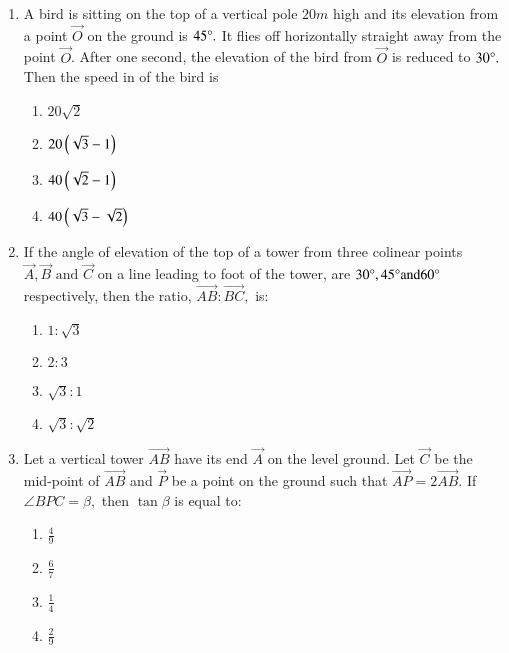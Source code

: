 \documentclass[journal]{IEEEtran}
\theoremstyle{remark}
\begin{document}
\begin{enumerate}[start=3]
\item A bird is sitting on the top of a vertical pole $20m$ high and its elevation from a point $\vec{O}$ on the  ground is $45\degree.$ It flies off horizontally straight away from the point $\vec{O}$. After one second, the elevation of the bird from $\vec{O}$ is reduced to $30\degree.$ Then the speed in  of the bird is \hfill{}
\begin{multicols}{4}
\begin{enumerate}
        \item $20\sqrt{2}$                    
        \item $20\left(\sqrt{3}-1\right)$ 
        \item $40\left(\sqrt{2}-1\right)$ 
        \item $40\left(\sqrt{3}-\sqrt{2}\right)$
\end{enumerate}
\end{multicols} 

\item If the angle of elevation of the top of a tower from three colinear points $\vec{A},\vec{B}\text{ and }\vec{C}$ on a line leading to foot of the tower, are $30\degree,45\degree \text{and}  60\degree$ respectively, then the ratio, $\vec{AB}:\vec{BC},$ is: 
\hfill{}
\begin{multicols}{4}
\begin{enumerate}
        \item $1:\sqrt{3}$                    
        \item $2:3$ 
        \item $\sqrt{3}:1$ 
        \item $\sqrt{3}:\sqrt{2}$
\end{enumerate}
\end{multicols} 

\item Let a vertical tower $\vec{AB}$ have its end $\vec{A}$ on the level ground. Let $\vec{C}$ be the  mid-point of $\vec{AB}$ and $\vec{P}$ be a point on the ground such that $\vec{AP}=2\vec{AB}.$ If $\angle{BPC}=\beta,$ then $\tan \beta$ is equal to: \hfill{}
\begin{multicols}{4}
\begin{enumerate}
        \item $\frac{4}{9}$                    
        \item $\frac{6}{7}$ 
        \item $\frac{1}{4}$ 
        \item $\frac{2}{9}$
\end{enumerate}
\end{multicols} 


\end{enumerate}
\end{document}
